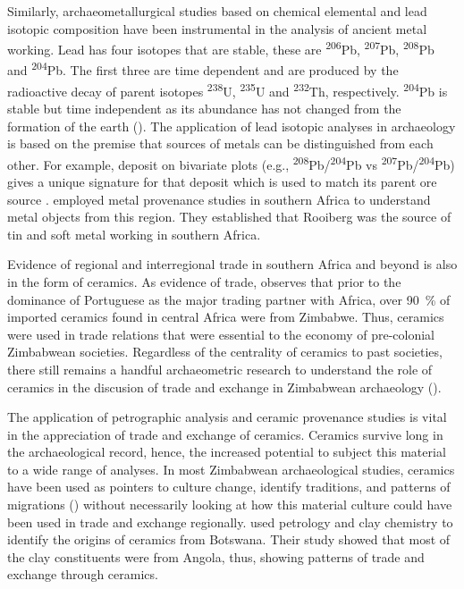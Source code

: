 Similarly, archaeometallurgical studies based on chemical elemental and lead isotopic composition have been instrumental in the analysis of ancient metal working. Lead has four isotopes that are stable,
these are
\textsuperscript{206}Pb,
\textsuperscript{207}Pb,
\textsuperscript{208}Pb and
\textsuperscript{204}Pb.
The first three are time dependent and are produced by the radioactive decay of parent isotopes
\textsuperscript{238}U,
\textsuperscript{235}U and
\textsuperscript{232}Th, respectively.
\textsuperscript{204}Pb is stable but time independent as its abundance has not changed from the formation of the earth (\cites{molofsky2009}{baron2014}{pernicka2014}). The application of lead isotopic analyses in archaeology is based on the premise that sources of metals can be distinguished from each other. For example, deposit on bivariate plots (e.g.,
\textsuperscript{208}Pb/\textsuperscript{204}Pb vs \textsuperscript{207}Pb/\textsuperscript{204}Pb) gives a unique signature for that deposit which is used to match its parent ore source \parencite{molofsky2009}. \textcite{molofsky2009} employed metal provenance studies in southern Africa to understand metal objects from this region. They established that Rooiberg was the source of tin and soft metal working in southern Africa.

Evidence of regional and interregional trade in southern Africa and beyond is also in the form of ceramics.
As evidence of trade, \textcite[][22]{garlake1968} observes that prior to the dominance of Portuguese as the major trading partner with Africa, over \SI{90}{\percent} of imported ceramics found in central Africa were from Zimbabwe. Thus, ceramics were used in trade relations that were essential to the economy of pre-colonial Zimbabwean societies. Regardless of the centrality of ceramics to past societies, there still remains a handful archaeometric research to understand the role of ceramics in the discusion of trade and exchange in Zimbabwean archaeology  (\cites{lindahl2010}{ashley2015}).

The application of petrographic analysis and ceramic provenance studies is vital in the appreciation of trade and exchange of ceramics. Ceramics survive long in the archaeological record, hence, the increased potential to subject this material to a wide range of analyses. In most Zimbabwean archaeological studies, ceramics have been used as pointers to culture change, identify traditions, and patterns of migrations (\cites{huffman1972}{pikirayi1993}{pikirayi1996}{pwiti1996}) without necessarily looking at how this material culture could have been used in trade and exchange regionally. \textcite{wilmsen2009} used petrology and clay chemistry to identify the origins of ceramics from Botswana. Their study showed that most of the clay constituents were from Angola, thus, showing patterns of trade and exchange through ceramics.

